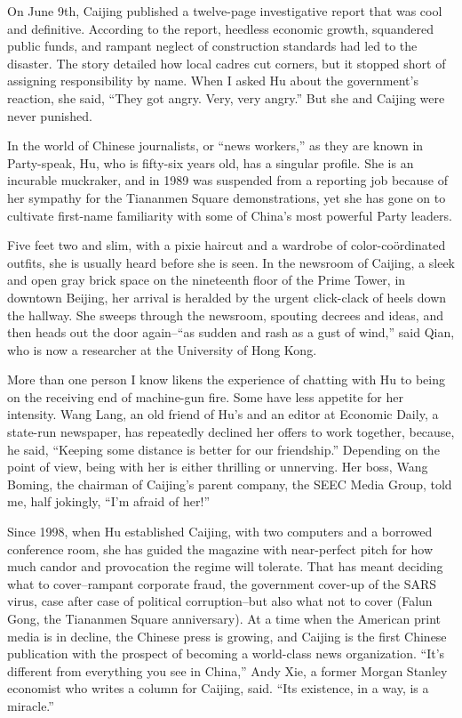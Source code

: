 ﻿\documentclass[12pt]{article}
\begin{document}
On June 9th, Caijing published a twelve-page investigative report that was cool and definitive.
According to the report, heedless economic growth, squandered public funds, and rampant neglect of
construction standards had led to the disaster. The story detailed how local cadres cut corners, but
it stopped short of assigning responsibility by name. When I asked Hu about the government's
reaction, she said, ``They got angry. Very, very angry.'' But she and Caijing were never punished.

In the world of Chinese journalists, or ``news workers,'' as they are known in Party-speak, Hu, who
is fifty-six years old, has a singular profile. She is an incurable muckraker, and in 1989 was
suspended from a reporting job because of her sympathy for the Tiananmen Square demonstrations, yet
she has gone on to cultivate first-name familiarity with some of China's most powerful Party
leaders.

Five feet two and slim, with a pixie haircut and a wardrobe of color-coördinated outfits, she is
usually heard before she is seen. In the newsroom of Caijing, a sleek and open gray brick space on
the nineteenth floor of the Prime Tower, in downtown Beijing, her arrival is heralded by the urgent
click-clack of heels down the hallway. She sweeps through the newsroom, spouting decrees and ideas,
and then heads out the door again--``as sudden and rash as a gust of wind,'' said Qian, who is now a
researcher at the University of Hong Kong.

More than one person I know likens the experience of chatting with Hu to being on the receiving end
of machine-gun fire. Some have less appetite for her intensity. Wang Lang, an old friend of Hu's and
an editor at Economic Daily, a state-run newspaper, has repeatedly declined her offers to work
together, because, he said, ``Keeping some distance is better for our friendship.'' Depending on the
point of view, being with her is either thrilling or unnerving. Her boss, Wang Boming, the chairman
of Caijing's parent company, the SEEC Media Group, told me, half jokingly, ``I'm afraid of her!''

Since 1998, when Hu established Caijing, with two computers and a borrowed conference room, she has
guided the magazine with near-perfect pitch for how much candor and provocation the regime will
tolerate. That has meant deciding what to cover--rampant corporate fraud, the government cover-up of
the SARS virus, case after case of political corruption--but also what not to cover (Falun Gong, the
Tiananmen Square anniversary). At a time when the American print media is in decline, the Chinese
press is growing, and Caijing is the first Chinese publication with the prospect of becoming a
world-class news organization. ``It's different from everything you see in China,'' Andy Xie, a
former Morgan Stanley economist who writes a column for Caijing, said. ``Its existence, in a way, is
a miracle.''
\end{document}
